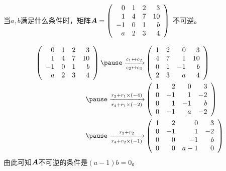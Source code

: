 \begin{frame}
  \begin{li}
    当$a,b$满足什么条件时，矩阵$\boldsymbol{A}=\left(
      \begin{array}{rrrr}
        0&1&2&3\\
        1&4&7&10\\
        -1&0&1&b\\
        a&2&3&4
      \end{array}
    \right)$
    不可逆。
  \end{li}
\end{frame}


\begin{frame}
  \begin{jie}
    $$
    \begin{aligned}
      \left(
        \begin{array}{rrrr}
          0&1&2&3\\
          1&4&7&10\\
          -1&0&1&b\\
          a&2&3&4
        \end{array}
      \right)\pause\xrightarrow[c_2\leftrightarrow c_3]{c_1\leftrightarrow c_2} &
      \left(
        \begin{array}{rrrr}
          1 & 2 & 0 & 3\\
          4 & 7 & 1 & 10\\
          0 & 1 & -1 & b\\
          2 & 3 & a & 4\\
        \end{array}
      \right)\\\pause
      \xrightarrow[r_4+r_1\times(-2)]{r_2+r_1\times(-4)}&
      \left(
        \begin{array}{rrrr}
          1 & 2 & 0 & 3\\
          0 & -1 & 1 & -2\\
          0 & 1 & -1 & b\\
          0 & -1 & a & -2\\
        \end{array}
      \right)\\\pause
      \xrightarrow[r_4+r_2\times(-1)]{r_3+r_2}&
      \left(
        \begin{array}{rrrr}      
          1 & 2 & 0 & 3\\
          0 & -1 & 1 & -2\\
          0 & 0 & -1 & b\\
          0 & 0 & a-1 & 0\\
        \end{array}
      \right)
    \end{aligned}
    $$\pause
    由此可知$\boldsymbol{A}$不可逆的条件是$(a-1)b=0$。
  \end{jie}
\end{frame}


